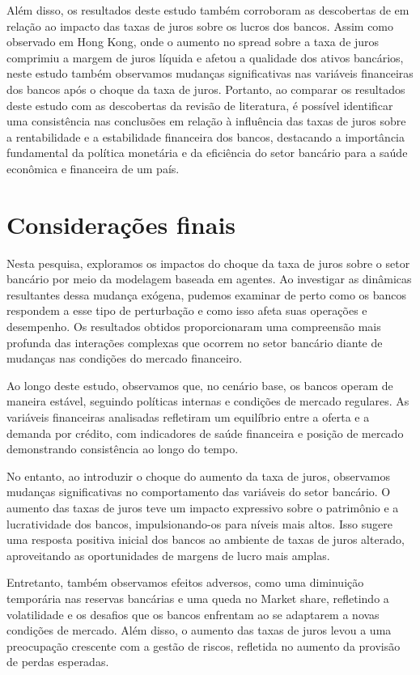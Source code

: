 \documentclass[hidelinks, article,12pt,oneside,a4paper,english,brazil,sumario=tradicional]{abntex2}
\begin{document}
Além disso, os resultados deste estudo também corroboram as descobertas de  em relação ao impacto das taxas de juros sobre os lucros dos bancos. Assim como observado em Hong Kong, onde o aumento no spread sobre a taxa de juros comprimiu a margem de juros líquida e afetou a qualidade dos ativos bancários, neste estudo também observamos mudanças significativas nas variáveis financeiras dos bancos após o choque da taxa de juros. Portanto, ao comparar os resultados deste estudo com as descobertas da revisão de literatura, é possível identificar uma consistência nas conclusões em relação à influência das taxas de juros sobre a rentabilidade e a estabilidade financeira dos bancos, destacando a importância fundamental da política monetária e da eficiência do setor bancário para a saúde econômica e financeira de um país. 


\section{Considerações finais}

Nesta pesquisa, exploramos os impactos do choque da taxa de juros sobre o setor bancário por meio da modelagem baseada em agentes. Ao investigar as dinâmicas resultantes dessa mudança exógena, pudemos examinar de perto como os bancos respondem a esse tipo de perturbação e como isso afeta suas operações e desempenho. Os resultados obtidos proporcionaram uma compreensão mais profunda das interações complexas que ocorrem no setor bancário diante de mudanças nas condições do mercado financeiro.

Ao longo deste estudo, observamos que, no cenário base, os bancos operam de maneira estável, seguindo políticas internas e condições de mercado regulares. As variáveis financeiras analisadas refletiram um equilíbrio entre a oferta e a demanda por crédito, com indicadores de saúde financeira e posição de mercado demonstrando consistência ao longo do tempo.

No entanto, ao introduzir o choque do aumento da taxa de juros, observamos mudanças significativas no comportamento das variáveis do setor bancário. O aumento das taxas de juros teve um impacto expressivo sobre o patrimônio e a lucratividade dos bancos, impulsionando-os para níveis mais altos. Isso sugere uma resposta positiva inicial dos bancos ao ambiente de taxas de juros alterado, aproveitando as oportunidades de margens de lucro mais amplas.

Entretanto, também observamos efeitos adversos, como uma diminuição temporária nas reservas bancárias e uma queda no Market share, refletindo a volatilidade e os desafios que os bancos enfrentam ao se adaptarem a novas condições de mercado. Além disso, o aumento das taxas de juros levou a uma preocupação crescente com a gestão de riscos, refletida no aumento da provisão de perdas esperadas.
\end{document}
